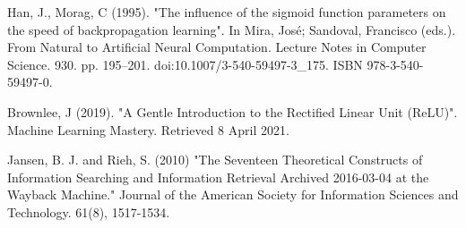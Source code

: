\begin{thebibliography}{25}
 Han, J., Morag, C (1995). "The influence of the sigmoid function parameters on the speed of backpropagation learning". In Mira, José; Sandoval, Francisco (eds.). From Natural to Artificial Neural Computation. Lecture Notes in Computer Science. 930. pp. 195–201. doi:10.1007/3-540-59497-3\_175. ISBN 978-3-540-59497-0.

 Brownlee, J (2019). "A Gentle Introduction to the Rectified Linear Unit (ReLU)". Machine Learning Mastery. Retrieved 8 April 2021.

 Jansen, B. J. and Rieh, S. (2010) "The Seventeen Theoretical Constructs of Information Searching and Information Retrieval Archived 2016-03-04 at the Wayback Machine." Journal of the American Society for Information Sciences and Technology. 61(8), 1517-1534.

\end{thebibliography}
